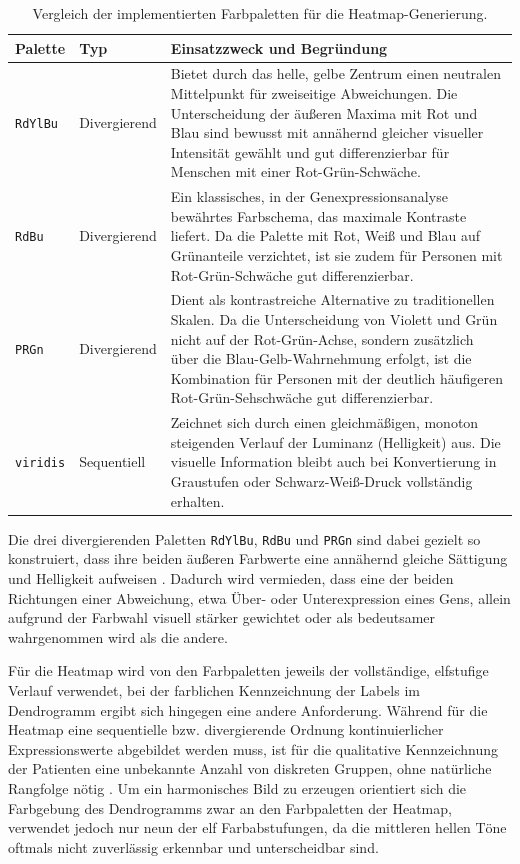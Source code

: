 \documentclass[12pt]{article}
\begin{document}
\begin{table}[H]
\centering
\small
\caption{Vergleich der implementierten Farbpaletten für die Heatmap-Generierung.}
\label{tab:farbpaletten}
\vspace{0.2cm}
\begin{tabularx}{\textwidth}{l l X}
\toprule
\textbf{Palette} & \textbf{Typ} & \textbf{Einsatzzweck und Begründung} \\
\midrule
\texttt{RdYlBu} & Divergierend & Bietet durch das helle, gelbe Zentrum einen neutralen Mittelpunkt für zweiseitige Abweichungen. Die Unterscheidung der äußeren Maxima mit Rot und Blau sind bewusst mit annähernd gleicher visueller Intensität gewählt und gut differenzierbar für Menschen mit einer Rot-Grün-Schwäche. \\
\addlinespace
\texttt{RdBu} & Divergierend & Ein klassisches, in der Genexpressionsanalyse bewährtes Farbschema, das maximale Kontraste liefert. Da die Palette mit Rot, Weiß und Blau auf Grünanteile verzichtet, ist sie zudem für Personen mit Rot-Grün-Schwäche gut differenzierbar. \\
\addlinespace
\texttt{PRGn} & Divergierend & Dient als kontrastreiche Alternative zu traditionellen Skalen. Da die Unterscheidung von Violett und Grün nicht auf der Rot-Grün-Achse, sondern zusätzlich über die Blau-Gelb-Wahrnehmung erfolgt, ist die Kombination für Personen mit der deutlich häufigeren Rot-Grün-Sehschwäche gut differenzierbar. \\
\addlinespace
\texttt{viridis} & Sequentiell & Zeichnet sich durch einen gleichmäßigen, monoton steigenden Verlauf der Luminanz (Helligkeit) aus. Die visuelle Information bleibt auch bei Konvertierung in Graustufen oder Schwarz-Weiß-Druck vollständig erhalten. \\
\bottomrule
\end{tabularx}
\end{table}

Die drei divergierenden Paletten \texttt{RdYlBu}, \texttt{RdBu} und \texttt{PRGn} sind dabei gezielt so konstruiert, dass ihre beiden äußeren Farbwerte eine annähernd gleiche Sättigung und Helligkeit aufweisen \cite{HarrowerBrewer2003}. Dadurch wird vermieden, dass eine der beiden Richtungen einer Abweichung, etwa Über- oder Unterexpression eines Gens, allein aufgrund der Farbwahl visuell stärker gewichtet oder als bedeutsamer wahrgenommen wird als die andere.

Für die Heatmap wird von den Farbpaletten jeweils der vollständige, elfstufige Verlauf verwendet, bei der farblichen Kennzeichnung der Labels im Dendrogramm ergibt sich hingegen eine andere Anforderung. Während für die Heatmap eine sequentielle bzw. divergierende Ordnung kontinuierlicher Expressionswerte abgebildet werden muss, ist für die qualitative Kennzeichnung der Patienten eine unbekannte Anzahl von diskreten Gruppen, ohne natürliche Rangfolge nötig \cite{HarrowerBrewer2003}. Um ein harmonisches Bild zu erzeugen orientiert sich die Farbgebung des Dendrogramms zwar an den Farbpaletten der Heatmap, verwendet jedoch nur neun der elf Farbabstufungen, da die mittleren hellen Töne oftmals nicht zuverlässig erkennbar und unterscheidbar sind. 
\end{document}
